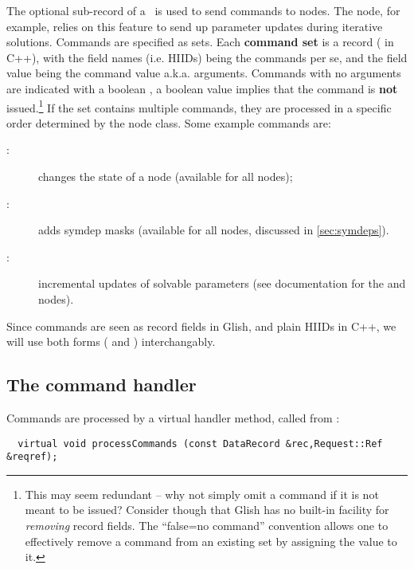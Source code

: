   The optional  sub-record of a \Request\ is used to send commands to
  nodes. The  node, for example, relies on this feature to send up
  parameter updates during iterative solutions. Commands are specified as sets.
  Each {\bf command set} is a record ( in C++), with the field
  names (i.e. HIIDs) being the commands per se, and the field value being the
  command value a.k.a. arguments. Commands with no arguments are indicated with
  a boolean , a boolean  value implies that the command is
  {\bf not} issued.\footnote{This may seem redundant -- why not simply omit a
  command if it is not meant to be issued? Consider though that Glish has no
  built-in facility for {\em removing} record fields. The ``false=no command''
  convention allows one to effectively remove a command from an existing set by
  assigning the  value to it.} If the set contains multiple commands,
  they are processed in a specific order determined by the node class. Some
  example commands are:

  \begin{description}
  
  \item[:] changes the state of a node (available for all nodes);
  
  \item[:] adds symdep masks (available for all nodes,
  discussed in \ref{sec:symdeps}).

  \item[:] incremental updates of solvable parameters (see
  documentation for the  and  nodes).
  
  \end{description}
  
  Since commands are seen as record fields in Glish, and plain HIIDs in C++, we
  will use both forms ( and ) interchangably.
  
\subsection{The command handler}

  Commands are processed by a virtual handler method, called from
  :

\begin{verbatim}
  virtual void processCommands (const DataRecord &rec,Request::Ref &reqref);
\end{verbatim}

